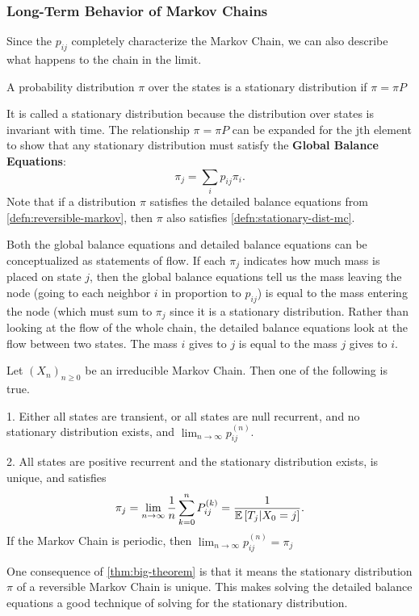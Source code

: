 \subsubsection{Long-Term Behavior of Markov Chains}
Since the $p_{ij}$ completely characterize the Markov Chain, we can also describe what happens to the chain in the limit.
\begin{definition}
	A probability distribution $\pi$ over the states is a stationary distribution if $\pi = \pi P$
	\label{defn:stationary-dist-mc}
\end{definition}
It is called a stationary distribution because the distribution over states is invariant with time.
The relationship $\pi = \pi P$ can be expanded for the jth element to show that any stationary distribution must satisfy the \textbf{Global Balance Equations}:
\[
	\pi_j = \sum_i p_{ij}\pi_i.
\]
Note that if a distribution $\pi$ satisfies the detailed balance equations from \cref{defn:reversible-markov}, then $\pi$ also satisfies \cref{defn:stationary-dist-mc}.

Both the global balance equations and detailed balance equations can be conceptualized as statements of flow.
If each $\pi_j$ indicates how much mass is placed on state $j$, then the global balance equations tell us the mass leaving the node (going to each neighbor $i$ in proportion to $p_{ij}$) is equal to the mass entering the node (which must sum to $\pi_j$ since it is a stationary distribution.
Rather than looking at the flow of the whole chain, the detailed balance equations look at the flow between two states. The mass $i$ gives to $j$ is equal to the mass $j$ gives to $i$.
\begin{theorem}
	Let $(X_n)_{n\geq 0}$ be an irreducible Markov Chain. Then one of the following is true.

	1. Either all states are transient, or all states are null recurrent, and no stationary distribution exists, and $\lim_{n\to\infty}p_{ij}^{(n)}$.
	
	2. All states are positive recurrent and the stationary distribution exists, is unique, and satisfies \[
		\pi_j = \lim_{n\to\infty}\frac{1}{n}\sum_{k=0}^{n}P_{ij}^{(k)} = \frac{1}{\mathbb{E}\left[T_j|X_0=j\right]}.
		\]
		If the Markov Chain is periodic, then $\lim_{n\to\infty}p_{ij}^{(n)} = \pi_j$
	\label{thm:big-theorem}
\end{theorem}
One consequence of \cref{thm:big-theorem} is that it means the stationary distribution $\pi$ of a reversible Markov Chain is unique.
This makes solving the detailed balance equations a good technique of solving for the stationary distribution.
